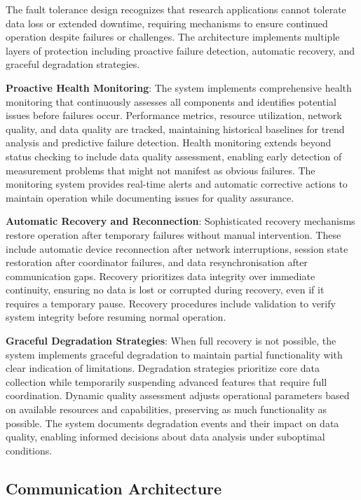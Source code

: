 \documentclass[11pt,a4paper]{report}
\begin{document}
The fault tolerance design recognizes that research applications cannot tolerate data loss or extended downtime, requiring mechanisms to ensure continued operation despite failures or challenges. The architecture implements multiple layers of protection including proactive failure detection, automatic recovery, and graceful degradation strategies.

\textbf{Proactive Health Monitoring}: The system implements comprehensive health monitoring that continuously assesses all components and identifies potential issues before failures occur. Performance metrics, resource utilization, network quality, and data quality are tracked, maintaining historical baselines for trend analysis and predictive failure detection. Health monitoring extends beyond status checking to include data quality assessment, enabling early detection of measurement problems that might not manifest as obvious failures. The monitoring system provides real-time alerts and automatic corrective actions to maintain operation while documenting issues for quality assurance.

\textbf{Automatic Recovery and Reconnection}: Sophisticated recovery mechanisms restore operation after temporary failures without manual intervention. These include automatic device reconnection after network interruptions, session state restoration after coordinator failures, and data resynchronisation after communication gaps. Recovery prioritizes data integrity over immediate continuity, ensuring no data is lost or corrupted during recovery, even if it requires a temporary pause. Recovery procedures include validation to verify system integrity before resuming normal operation.

\textbf{Graceful Degradation Strategies}: When full recovery is not possible, the system implements graceful degradation to maintain partial functionality with clear indication of limitations. Degradation strategies prioritize core data collection while temporarily suspending advanced features that require full coordination. Dynamic quality assessment adjusts operational parameters based on available resources and capabilities, preserving as much functionality as possible. The system documents degradation events and their impact on data quality, enabling informed decisions about data analysis under suboptimal conditions.

\subsection{Communication Architecture}
\end{document}
